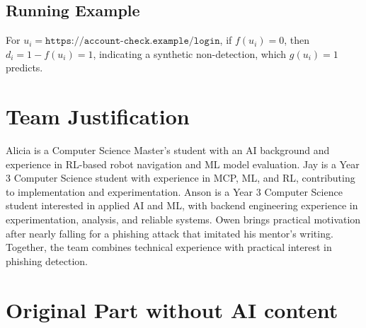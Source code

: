 \documentclass[sigconf]{acmart}
\begin{document}
\begin{bibunit}
\subsection{Running Example}

For $u_i=\texttt{https://account-check.example/login}$, if
$f(u_i)=0$, then $d_i=1-f(u_i)=1$, indicating a synthetic
non-detection, which $g(u_i)=1$ predicts.

\section{Team Justification}

Alicia is a Computer Science Master's student with an AI background and experience in RL-based robot navigation and ML model evaluation. Jay is a Year 3 Computer Science student with experience in MCP, ML, and RL, contributing to implementation and experimentation. Anson is a Year 3 Computer Science student interested in applied AI and ML, with backend engineering experience in experimentation, analysis, and reliable systems. Owen brings practical motivation after nearly falling for a phishing attack that imitated his mentor's writing. Together, the team combines technical experience with practical interest in phishing detection.

\putbib[bibliography1]
\end{bibunit}


\appendix
\section{Original Part without AI content}
\end{document}
